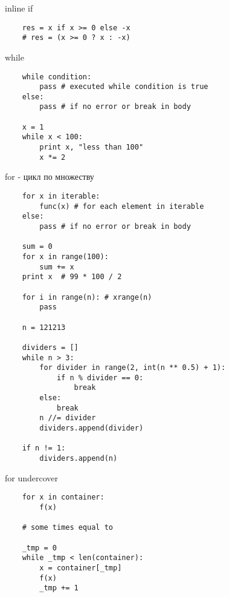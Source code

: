 \documentclass{article}
\begin{document}
\begin{center} inline if \end{center}
\vspace{15pt}
\begin{lstlisting}
	res = x if x >= 0 else -x
	# res = (x >= 0 ? x : -x)
\end{lstlisting}
\newpage

\begin{center} while \end{center}
\vspace{15pt}
\begin{lstlisting}
	while condition:
		pass # executed while condition is true
	else:
		pass # if no error or break in body

	x = 1
	while x < 100:
		print x, "less than 100"
		x *= 2
\end{lstlisting}
\newpage

\begin{center} for - цикл по множеству \end{center}
\vspace{15pt}
\begin{lstlisting}
	for x in iterable:
		func(x) # for each element in iterable
	else:
		pass # if no error or break in body

	sum = 0
	for x in range(100):
		sum += x
	print x  # 99 * 100 / 2

	for i in range(n): # xrange(n)
	    pass

	n = 121213

    dividers = []
    while n > 3:
        for divider in range(2, int(n ** 0.5) + 1):
            if n % divider == 0:
                break
        else:
            break
        n //= divider
        dividers.append(divider)

    if n != 1:
    	dividers.append(n)
\end{lstlisting}
\newpage

\begin{center} for undercover \end{center}
\vspace{15pt}
\begin{lstlisting}
	for x in container:
	    f(x)

	# some times equal to

	_tmp = 0
	while _tmp < len(container):
	    x = container[_tmp]
	    f(x)
	    _tmp += 1
\end{lstlisting}
\newpage
\end{document}

